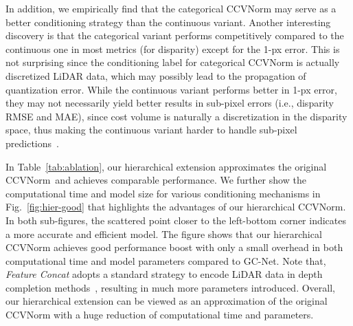 \documentclass[letterpaper, 10 pt, conference]{ieeeconf}
\newcommand{\modelNameCBN}{CCVNorm }
\newcommand{\modelNameCBNPunc}{CCVNorm}
\newcommand{\tabref}{Table~\ref}
\newcommand{\figref}{Fig.~\ref}
\begin{document}
{{{}
In addition, we empirically find that the categorical \modelNameCBN may serve as a better conditioning strategy than the continuous variant.
Another interesting discovery is that the categorical variant performs competitively compared to the continuous one in most metrics (for disparity) except for the 1-px error. This is not surprising since the conditioning label for categorical \modelNameCBN is actually discretized LiDAR data, which may possibly lead to the propagation of quantization error. 
While the continuous variant performs better in 1-px error, they may not necessarily yield better results in sub-pixel errors (i.e., disparity RMSE and MAE), since cost volume is naturally a discretization in the disparity space, thus making the continuous variant harder to handle sub-pixel predictions~\cite{stereogcnet}.


{\flushleft {\bf Benefits of Hierarchical \modelNameCBNPunc.}}
In \tabref{tab:ablation}, our hierarchical extension approximates the original \modelNameCBNPunc ~and achieves comparable performance.
We further show the computational time and model size for various conditioning mechanisms in \figref{fig:hier-good} that highlights the advantages of our hierarchical \modelNameCBNPunc. 
In both sub-figures, the scattered point closer to the left-bottom corner indicates a more accurate and efficient model.
The figure shows that our hierarchical \modelNameCBN achieves good performance boost with only a small overhead in both computational time and model parameters compared to GC-Net. 
Note that, \textit{Feature Concat} adopts a standard strategy to encode LiDAR data in depth completion methods~\cite{depths2d}\cite{depthsss2d}, resulting in much more parameters introduced. 
Overall, our hierarchical extension can be viewed as an approximation of the original \modelNameCBN with a huge reduction of computational time and parameters.
}
}
\end{document}
